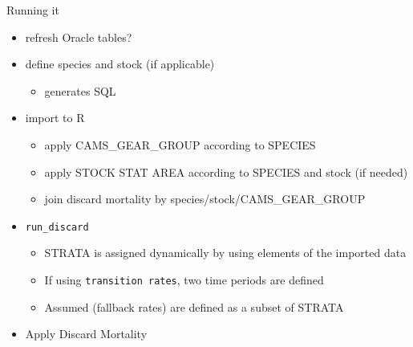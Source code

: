 \documentclass[
  ignorenonframetext,
]{beamer}
\providecommand{\tightlist}{%
  \setlength{\itemsep}{0pt}\setlength{\parskip}{0pt}}
\begin{document}
\begin{frame}[fragile]{Running it}
\protect\hypertarget{running-it}{}

\begin{itemize}
\tightlist
\item
  refresh Oracle tables?
\item
  define species and stock (if applicable)

  \begin{itemize}
  \tightlist
  \item
    generates SQL
  \end{itemize}
\item
  import to R

  \begin{itemize}
  \tightlist
  \item
    apply CAMS\_GEAR\_GROUP according to SPECIES
  \item
    apply STOCK STAT AREA according to SPECIES and stock (if needed)
  \item
    join discard mortality by species/stock/CAMS\_GEAR\_GROUP
  \end{itemize}
\item
  \texttt{run\_discard}

  \begin{itemize}
  \tightlist
  \item
    STRATA is assigned dynamically by using elements of the imported
    data
  \item
    If using \texttt{transition\ rates}, two time periods are defined
  \item
    Assumed (fallback rates) are defined as a subset of STRATA
  \end{itemize}
\item
  Apply Discard Mortality
\end{itemize}

\end{frame}
\end{document}
